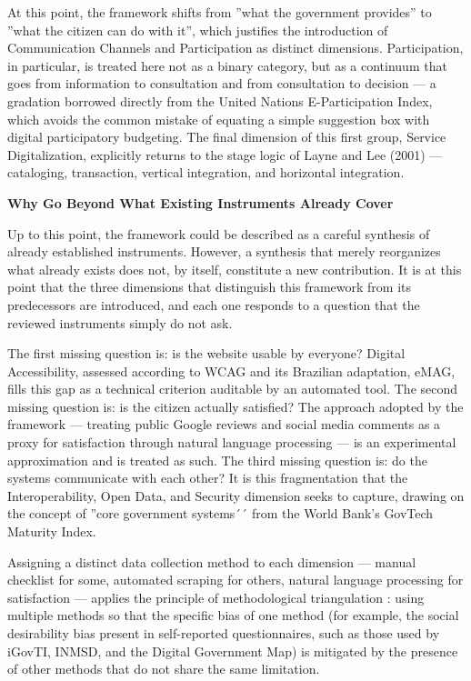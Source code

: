 \documentclass[12pt]{article}
\begin{document}
At this point, the framework shifts from ''what the government provides'' to ''what the citizen can do with it'', which justifies the introduction of Communication Channels and Participation as distinct dimensions. Participation, in particular, is treated here not as a binary category, but as a continuum that goes from information to consultation and from consultation to decision — a gradation borrowed directly from the United Nations E-Participation Index, which avoids the common mistake of equating a simple suggestion box with digital participatory budgeting. The final dimension of this first group, Service Digitalization, explicitly returns to the stage logic of Layne and Lee (2001) — cataloging, transaction, vertical integration, and horizontal integration.

\textbf{Why Go Beyond What Existing Instruments Already Cover}

Up to this point, the framework could be described as a careful synthesis of already established instruments. However, a synthesis that merely reorganizes what already exists does not, by itself, constitute a new contribution. It is at this point that the three dimensions that distinguish this framework from its predecessors are introduced, and each one responds to a question that the reviewed instruments simply do not ask.

The first missing question is: is the website usable by everyone? Digital Accessibility, assessed according to WCAG and its Brazilian adaptation, eMAG, fills this gap as a technical criterion auditable by an automated tool. The second missing question is: is the citizen actually satisfied? The approach adopted by the framework — treating public Google reviews and social media comments as a proxy for satisfaction through natural language processing — is an experimental approximation and is treated as such. The third missing question is: do the systems communicate with each other? It is this fragmentation that the Interoperability, Open Data, and Security dimension seeks to capture, drawing on the concept of ''core government systems´´ from the World Bank's GovTech Maturity Index.

Assigning a distinct data collection method to each dimension — manual checklist for some, automated scraping for others, natural language processing for satisfaction — applies the principle of methodological triangulation \cite{denzin1978}: using multiple methods so that the specific bias of one method (for example, the social desirability bias present in self-reported questionnaires, such as those used by iGovTI, INMSD, and the Digital Government Map) is mitigated by the presence of other methods that do not share the same limitation.
\end{document}
